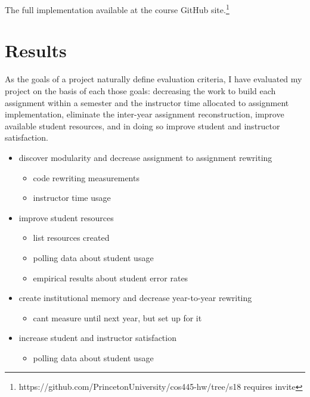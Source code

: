 \documentclass[pageno]{jpaper}
\begin{document}
The full implementation available at the course GitHub site.\footnote{https://github.com/PrincetonUniversity/cos445-hw/tree/s18 requires invite}

\section*{Results}
As the goals of a project naturally define evaluation criteria, I have evaluated my project on the basis of each those goals: decreasing the work to build each assignment within a semester and the instructor time allocated to assignment implementation, eliminate the inter-year assignment reconstruction, improve available student resources, and in doing so improve student and instructor satisfaction.

\begin{itemize}
\item discover modularity and decrease assignment to assignment rewriting
  \begin{itemize}
  \item code rewriting measurements
  \item instructor time usage
  \end{itemize}
\item improve student resources
  \begin{itemize}
  \item list resources created
  \item polling data about student usage
  \item empirical results about student error rates
  \end{itemize}
\item create institutional memory and decrease year-to-year rewriting
  \begin{itemize}
  \item cant measure until next year, but set up for it
  \end{itemize}
\item increase student and instructor satisfaction
  \begin{itemize}
  \item polling data about student usage
  \end{itemize}
\end{itemize}

\end{document}
